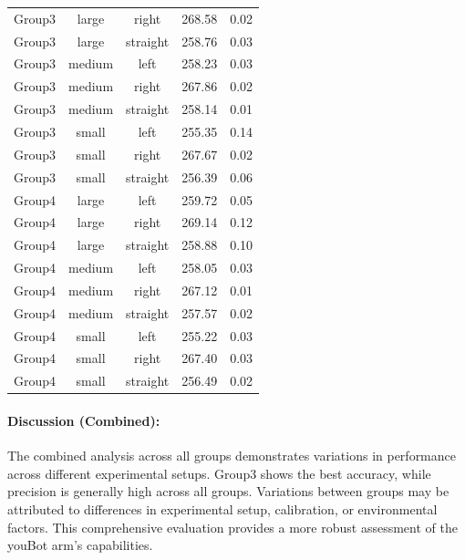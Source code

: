 \documentclass{article}
\begin{document}
\begin{table}[H]
\begin{tabular}{|c|c|c|c|c|}
Group3 & large & right & 268.58 & 0.02 \\
Group3 & large & straight & 258.76 & 0.03 \\
Group3 & medium & left & 258.23 & 0.03 \\
Group3 & medium & right & 267.86 & 0.02 \\
Group3 & medium & straight & 258.14 & 0.01 \\
Group3 & small & left & 255.35 & 0.14 \\
Group3 & small & right & 267.67 & 0.02 \\
Group3 & small & straight & 256.39 & 0.06 \\
Group4 & large & left & 259.72 & 0.05 \\
Group4 & large & right & 269.14 & 0.12 \\
Group4 & large & straight & 258.88 & 0.10 \\
Group4 & medium & left & 258.05 & 0.03 \\
Group4 & medium & right & 267.12 & 0.01 \\
Group4 & medium & straight & 257.57 & 0.02 \\
Group4 & small & left & 255.22 & 0.03 \\
Group4 & small & right & 267.40 & 0.03 \\
Group4 & small & straight & 256.49 & 0.02 \\
\hline
\end{tabular}
\end{table}


\paragraph{Discussion (Combined):}
The combined analysis across all groups demonstrates variations in performance across different experimental setups. Group3 shows the best accuracy, while precision is generally high across all groups. Variations between groups may be attributed to differences in experimental setup, calibration, or environmental factors. This comprehensive evaluation provides a more robust assessment of the youBot arm's capabilities.
\end{document}
